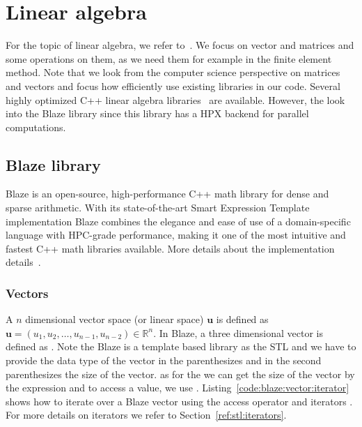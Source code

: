 \chapter{Linear algebra}
For the topic of linear algebra, we refer to~\cite{hefferonlinear,scheick1997linear}. We focus on vector and matrices and some operations on them, as we need them for example in the finite element method. Note that we look from the computer science perspective on matrices and vectors and focus how efficiently use existing libraries in our code. Several highly optimized C++ linear algebra libraries~\cite{wang2013augem,eigenweb,rupp2016viennacl,sanderson2016armadillo} are available. However, the look into the Blaze library since this library has a HPX backend for parallel computations. 


\section{Blaze library}
Blaze is an open-source, high-performance C++ math library for dense and sparse arithmetic. With its state-of-the-art Smart Expression Template implementation Blaze combines the elegance and ease of use of a domain-specific language with HPC-grade performance, making it one of the most intuitive and fastest C++ math libraries available. More details about the implementation details~\cite{doi:10.1137/110830125,6266939}.

\subsection{Vectors}
\label{sec:linalg:vectors}
A $n$ dimensional vector space (or linear space) $\mathbf{u}$ is defined as $\mathbf{u}=(u_1,u_2,\ldots,u_{n-1},u_{n-2})\in \mathbb{R}^n$. In Blaze, a three dimensional vector is defined as . Note the Blaze is a template based library as the STL and we have to provide the data type of the vector in the parenthesizes  and in the second parenthesizes  the size of the vector. as for the  we can get the size of the vector by the expression  and to access a value, we use . Listing~\ref{code:blaze:vector:iterator} shows how to iterate over a Blaze vector using the access operator  and iterators . For more details on iterators we refer to Section~\ref{ref:stl:iterators}. \\

